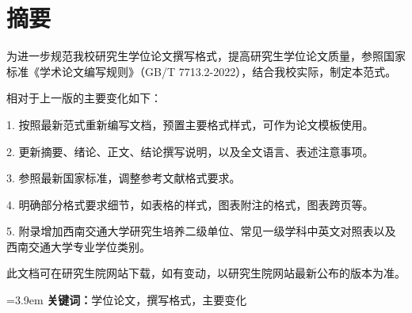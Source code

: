 \chapter*{摘\quad 要}
\cabstractpagestyle %

为进一步规范我校研究生学位论文撰写格式，提高研究生学位论文质量，参照国家标准《学术论文编写规则》（GB/T 7713.2-2022），结合我校实际，制定本范式。

相对于上一版的主要变化如下：

1. 按照最新范式重新编写文档，预置主要格式样式，可作为论文模板使用。

2. 更新摘要、绪论、正文、结论撰写说明，以及全文语言、表述注意事项。

3. 参照最新国家标准，调整参考文献格式要求。

4. 明确部分格式要求细节，如表格的样式，图表附注的格式，图表跨页等。

5. 附录增加西南交通大学研究生培养二级单位、常见一级学科中英文对照表以及西南交通大学专业学位类别。

此文档可在研究生院网站下载，如有变动，以研究生院网站最新公布的版本为准。

\vspace{1em}

\noindent \hangindent=3.9em \textbf{关键词：}学位论文，撰写格式，主要变化